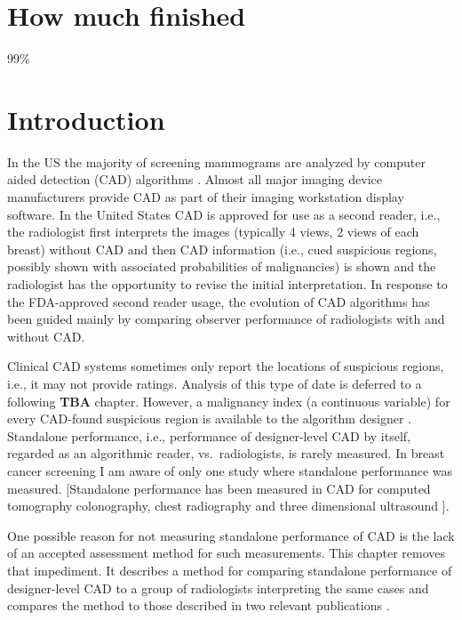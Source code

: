 \documentclass[
]{book}
\begin{document}
\hypertarget{standalone-cad-radiologists-how-much-finished}{%
\section{How much finished}\label{standalone-cad-radiologists-how-much-finished}}

99\%

\hypertarget{standalone-cad-radiologists-introduction}{%
\section{Introduction}\label{standalone-cad-radiologists-introduction}}

In the US the majority of screening mammograms are analyzed by computer aided detection (CAD) algorithms \citep{rao2010widely}. Almost all major imaging device manufacturers provide CAD as part of their imaging workstation display software. In the United States CAD is approved for use as a second reader, i.e., the radiologist first interprets the images (typically 4 views, 2 views of each breast) without CAD and then CAD information (i.e., cued suspicious regions, possibly shown with associated probabilities of malignancies) is shown and the radiologist has the opportunity to revise the initial interpretation. In response to the FDA-approved second reader usage, the evolution of CAD algorithms has been guided mainly by comparing observer performance of radiologists with and without CAD.

Clinical CAD systems sometimes only report the locations of suspicious regions, i.e., it may not provide ratings. Analysis of this type of date is deferred to a following \textbf{TBA} chapter. However, a malignancy index (a continuous variable) for every CAD-found suspicious region is available to the algorithm designer \citep{edwards2002maximum}. Standalone performance, i.e., performance of designer-level CAD by itself, regarded as an algorithmic reader, vs.~radiologists, is rarely measured. In breast cancer screening I am aware of only one study \citep{hupse2013standalone} where standalone performance was measured. {[}Standalone performance has been measured in CAD for computed tomography colonography, chest radiography and three dimensional ultrasound \citep{hein2010computeraided, summers2008performance, taylor2006computerassisted, deBoo2011computeraided, tan2012computeraided}{]}.

One possible reason for not measuring standalone performance of CAD is the lack of an accepted assessment method for such measurements. This chapter removes that impediment. It describes a method for comparing standalone performance of designer-level CAD to a group of radiologists interpreting the same cases and compares the method to those described in two relevant publications \citep{hupse2013standalone, kooi2016comparison}.
\end{document}
